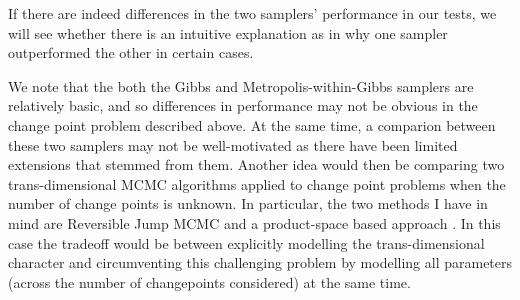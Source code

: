 \documentclass{article}
\begin{document}
If there are indeed differences in the two samplers' performance in our tests, we will see whether there is an intuitive explanation as in why one sampler outperformed the other in certain cases.

We note that the both the Gibbs and Metropolis-within-Gibbs samplers are relatively basic, and so differences in performance may not be obvious in the change point problem described above. At the same time, a comparion between these two samplers may not be well-motivated as there have been limited extensions that stemmed from them. Another idea would then be comparing two trans-dimensional MCMC algorithms applied to change point problems when the number of change points is unknown. In particular, the two methods I have in mind are Reversible Jump MCMC \cite{green1995reversible} and a product-space based approach \cite{carlin1995bayesian}. In this case the tradeoff would be between explicitly modelling the trans-dimensional character and circumventing this challenging problem by modelling all parameters (across the number of changepoints considered) at the same time.
\newpage


\end{document}
